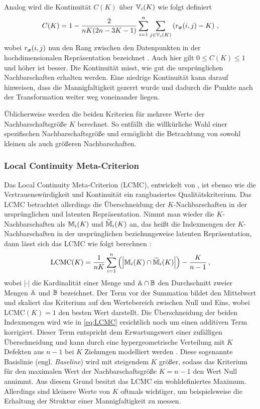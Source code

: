 Analog wird die Kontinuität $C(K)$ über $\mathbb{V}_i(K)$ wie folgt definiert
\begin{equation}
	C(K) = 1 - \frac{2}{nK(2n - 3K - 1)} \sum_{i = 1}^{n}\sum_{j \in \mathbb{V}_i(K) } \left( r_{\bm{x}}(i, j) - K \right) \, ,
\end{equation}
wobei $r_{\bm{x}}(i, j)$ nun den Rang zwischen den Datenpunkten in der hochdimensionalen Repräsentation bezeichnet \parencite[487]{Venna.2001}. Auch hier gilt $0 \leq C(K) \leq 1$ und höher ist besser. Die Kontinuität
misst, wie gut die ursprünglichen Nachbarschaften erhalten werden. Eine niedrige Kontinuität kann
darauf hinweisen, dass die Mannigfaltigkeit gezerrt wurde und dadurch die Punkte nach der
Transformation weiter weg voneinander liegen.

Üblicherweise werden die beiden Kriterien für mehrere Werte der Nachbarschaftsgröße $K$ berechnet. So entfällt die willkürliche Wahl einer spezifischen Nachbarschaftsgröße und ermöglicht die Betrachtung von sowohl kleinen als auch größeren Nachbarschaften.

\subsubsection{Local Continuity Meta-Criterion}
\label{ch:Vergleich:sec:Methodik:subsec:Qualitaetskriterien:LCMC}
Das Local Continuity Meta-Criterion (LCMC), entwickelt von \textcite{Chen.2009}, ist ebenso wie die Vertrauenswürdigkeit und Kontinuität ein rangbasiertes Qualitätskriterium. Das LCMC betrachtet allerdings die Überschneidung der $K$-Nachbarschaften in der ursprünglichen und latenten Repräsentation. Nimmt man wieder die $K$-Nachbarschaften als $\mathbb{M}_i(K)$ und $\widetilde{\mathbb{M}}_i(K)$ an, das heißt die Indexmengen der $K$-Nachbarschaften in der ursprünglichen beziehungsweise latenten Repräsentation, dann lässt sich das LCMC wie folgt berechnen \parencite[212]{Chen.2009}:
\begin{equation}
	\label{eq:LCMC}
	\text{LCMC}(K) = \frac{1}{nK} \sum_{i=1}^{n} \left( \left| \mathbb{M}_i(K) \cap \widetilde{\mathbb{M}}_i(K) \right| \right) - \frac{K}{n - 1} \,,
\end{equation}
wobei $­|\cdot|$ die Kardinalität einer Menge und $\mathbb{A} \cap \mathbb{B}$ den Durchschnitt zweier Mengen $\mathbb{A}$ und $\mathbb{B}$ bezeichnet. Der Term vor der Summation bildet den Mittelwert und skaliert das Kriterium auf den Wertebereich zwischen Null und Eins, wobei LCMC$(K) = 1$ den besten Wert darstellt. Die Überschneidung der beiden Indexmengen wird wie in \eqref{eq:LCMC} ersichtlich noch um einen additiven Term korrigiert. Dieser Term entspricht dem Erwartungswert einer zufälligen Überschneidung und kann durch eine hypergeometrische Verteilung mit $K$ Defekten aus $n - 1$ bei $K$ Ziehungen modelliert werden \parencite[213]{Chen.2009}. Diese sogenannte Basislinie (engl. \textit{Baseline}) wird mit steigendem
$K$ größer, sodass das Kriterium für den maximalen Wert der Nachbarschaftsgröße $K = n - 1$ den
Wert Null annimmt. Aus diesem Grund besitzt das LCMC ein wohldefiniertes Maximum. Allerdings sind
kleinere Werte von $K$ oftmals wichtiger, um beispielsweise die Erhaltung der Struktur einer
Mannigfaltigkeit zu messen.

